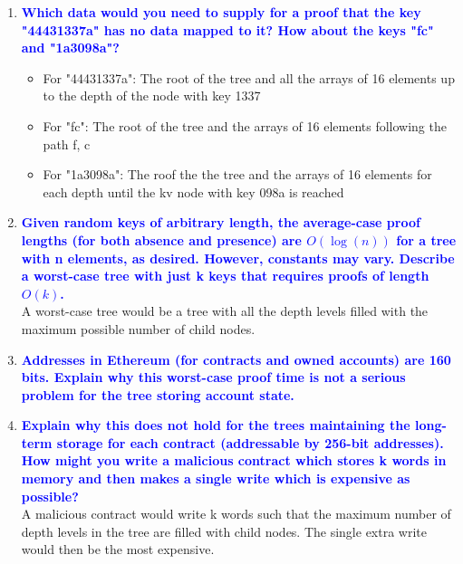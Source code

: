\documentclass[11pt]{article}
\begin{document}
\begin{enumerate}
\begin{enumerate}
    \item \textbf{\textcolor{blue}{Which data would you need to supply for a proof that the key "44431337a" has no data mapped to it? How about the keys "fc" and "1a3098a"?}}
        \begin{itemize}
            \item For "44431337a": The root of the tree and all the arrays of 16 elements up to the depth of the node with key 1337
            \item For "fc": The root of the tree and the arrays of 16 elements following the path f, c
            \item For "1a3098a": The roof the the tree and the arrays of 16 elements for each depth until the kv node with key 098a is reached
        \end{itemize}
    \item \textbf{\textcolor{blue}{Given random keys of arbitrary length, the average-case proof lengths (for both absence and presence) are $O(\log(n))$ for a tree with n elements, as desired. However, constants may vary. Describe a worst-case tree with just k keys that requires proofs of length $O(k)$.}}
        \\ A worst-case tree would be a tree with all the depth levels filled with the maximum possible number of child nodes.
    \item \textbf{\textcolor{blue}{Addresses in Ethereum (for contracts and owned accounts) are 160 bits. Explain why this worst-case proof time is not a serious problem for the tree storing account state.}}
    \item \textbf{\textcolor{blue}{Explain why this does not hold for the trees maintaining the long-term storage for each contract (addressable by 256-bit addresses). How might you write a malicious contract which stores k words in memory and then makes a single write which is expensive as possible?}}
        \\ A malicious contract would write k words such that the maximum number of depth levels in the tree are filled with child nodes. The single extra write would then be the most expensive.
\end{enumerate}


\end{enumerate}
\end{document}
